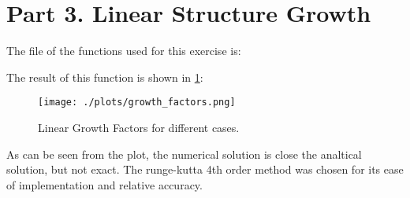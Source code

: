\section{Part 3. Linear Structure Growth}

The file of the functions used for this exercise is:



The result of this function is shown in \ref{fig:lgf}:

\begin{figure}[h!]
  \centering
  \texttt{[image: ./plots/growth\_factors.png]}
  \caption{Linear Growth Factors for different cases.}
  \label{fig:lgf}
\end{figure}

As can be seen from the plot, the numerical solution is close the analtical solution, but not exact.
The runge-kutta 4th order method was chosen for its ease of implementation and relative accuracy.
